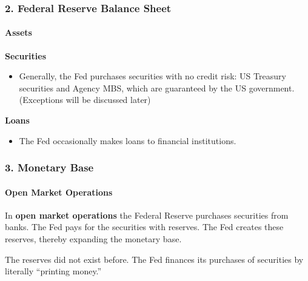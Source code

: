 \documentclass{beamer}
\begin{document}
\begin{frame}[t]
    \frametitle{2. Federal Reserve Balance Sheet}
    \framesubtitle{Assets}

    \textbf{Securities}
    \begin{itemize}
        \item Generally, the Fed purchases securities with no credit risk: US Treasury securities and Agency MBS, which are guaranteed by the US government.    (Exceptions will be discussed later)
    \end{itemize}
    \vspace{1em}

    \textbf{Loans}
    
        \begin{itemize}
            \item The Fed occasionally makes loans to financial institutions.
        \end{itemize}

\end{frame}

\begin{frame}[t]
    \frametitle{3. Monetary Base}
    \framesubtitle{Open Market Operations}
    
    \begin{center}
    \end{center}
    
    \vspace{1em}
    
    In \textbf{open market operations} the Federal Reserve purchases securities from banks.  The Fed pays for the securities with reserves.   The Fed creates these reserves, thereby expanding the monetary base.
    \vspace{1em}
    
    The reserves did not exist before.   The Fed finances its purchases of securities by literally “printing money.”

\end{frame}
\end{document}
